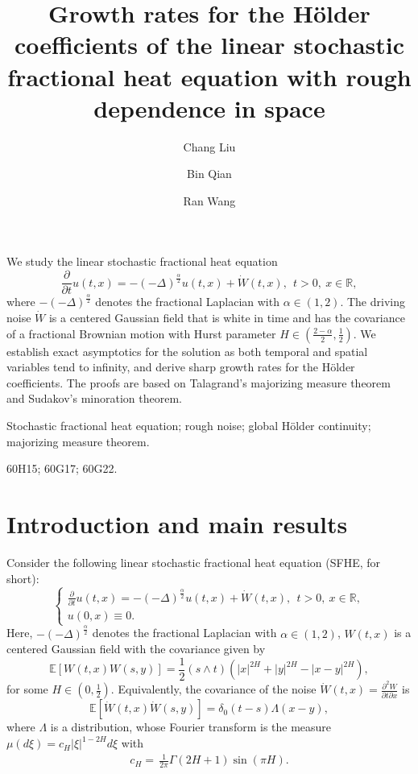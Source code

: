 \documentclass[11pt,reqno]{amsart}
\title[Growth rate for the  H\"older coefficients  of FSHE]{Growth rates for the  H\"older coefficients of   the linear stochastic fractional  heat equation  with  rough dependence in space}
\author[C. Liu]{Chang Liu}
\author[B. Qian]{Bin Qian}
\author[R. Wang]{Ran Wang}
\date{}
\numberwithin{equation}{section}
\def\RR{\mathbb{R}}
\def\ee{{\mathbb E}}
\newcommand{\1}{{\bf 1}}
\newcommand{\2}{{\bf 2}}
\begin{document}
    \maketitle
  
  
We study the linear stochastic fractional heat equation
$$
  \frac{\partial}{\partial t}u(t,x)=-(-\Delta)^{\frac{\alpha}2}u (t,x)+\dot{W}(t,x),\ \ t> 0,\  x\in\RR,
$$
where $-(-\Delta)^{\frac{\alpha}{2}}$ denotes the fractional Laplacian with  $\alpha\in (1, 2)$.  The driving noise $\dot W$ is a centered Gaussian field that is white in time and  has the covariance of a fractional Brownian motion with Hurst parameter $H\in\left(\frac {2-\alpha}2,\frac 12\right)$. We establish exact asymptotics for the solution as  both temporal and spatial variables tend to infinity,  and derive sharp growth rates for the H\"older coefficients. The proofs are based on Talagrand's majorizing measure theorem and Sudakov's minoration theorem.



     \vskip0.3cm
  {Stochastic fractional heat equation; rough noise; global H\"older continuity; majorizing measure theorem.}
 \vskip0.3cm


 {60H15; 60G17; 60G22.}

  
 
  


\section{Introduction and main results}
Consider the  following  linear stochastic fractional heat equation (SFHE, for short):
\begin{equation}\label{SFHE}
\begin{cases}
\frac{\partial}{\partial t}u(t,x) =-(-\Delta)^{\frac{\alpha}2}u(t,x)+ \dot{W}(t,x),\ \ t>0,\ x\in\RR, \\
u(0,x)\equiv 0.
\end{cases}
\end{equation}
Here, $-(-\Delta)^{\frac{\alpha}{2}}$ denotes the fractional Laplacian with   $\alpha\in (1,2)$,   $W(t,x)$ is a centered Gaussian field with the covariance given by
\begin{equation}\label{CovW}
\ee[W(t,x)W(s,y)]=\frac 12 \left(s\wedge t\right)\left( |x|^{2H}+|y|^{2H}-|x-y|^{2H} \right),
\end{equation}
for some $H\in\left(0, \frac12\right)$. Equivalently, the covariance of the noise $\dot{W}(t,x)=\frac{\partial^2 W}{\partial t\partial x}$ is
$$
\ee\left[\dot{W}(t,x)\dot{W}(s,y)\right]=\delta_0 (t-s)\Lambda\left(x-y\right),
$$
where $\Lambda$ is a distribution, whose Fourier transform is the measure $\mu(d\xi)=c_{H}|\xi|^{1-2H}d\xi$ with
\begin{align}
c_{H}= \,\frac{1}{2\pi}\Gamma(2H+1)\sin(\pi H).   \label{e.c1}
\end{align}
\end{document}
